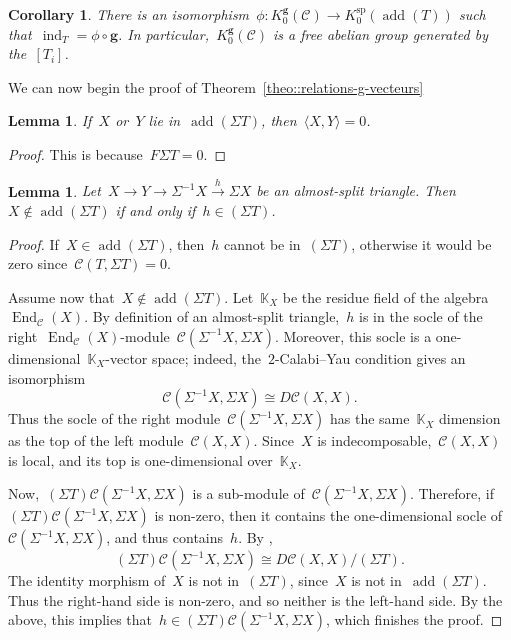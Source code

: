\documentclass{amsart}
\newtheorem{corollary}[theorem]{Corollary}
\newtheorem{lemma}[theorem]{Lemma}
\theoremstyle{definition}
\renewcommand{\b}[1]{{\boldsymbol{#1}}} %
\newcommand{\field}{\mathbb{K}}
\newcommand{\cat}{\mathcal{C}}
\newcommand{\susp}{\Sigma}
\newcommand{\add}{\operatorname{add}}
\newcommand{\End}[1]{\operatorname{End}_{#1}}
\newcommand{\spl}{\operatorname{sp}}
\newcommand{\Ksp}{K_0^{\spl}}
\newcommand{\Kg}{K_0^{\b{g}}}
\newcommand{\ind}{\operatorname{ind}}
\begin{document}
\begin{corollary}\label{coro::grothendieck-g-vectors}
 There is an isomorphism~$\phi:\Kg(\cat) \to \Ksp(\add(T))$ such that~$\ind_T = \phi\circ \b g$.  In particular,~$\Kg(\cat)$ is a free abelian group generated by the~$[T_i]$.
\end{corollary}

We can now begin the proof of Theorem~\ref{theo::relations-g-vecteurs}

\begin{lemma}\label{lemm::bilinear-form-suspention-T}
 If~$X$ or~$Y$ lie in~$\add(\susp T)$, then~$\langle X, Y \rangle = 0$.
\end{lemma}
\begin{proof}
 This is because~$F\susp T = 0$.
\end{proof}

\begin{lemma}\label{lemm::almost-split}
 Let~$X\xrightarrow{} Y \xrightarrow{} \susp^{-1} X \xrightarrow{h} \susp X$ be an almost-split triangle.  Then~$X\notin \add(\susp T)$ if and only if~$h\in (\susp T)$.
\end{lemma}
\begin{proof}
 If~$X\in \add(\susp T)$, then~$h$ cannot be in~$(\susp T)$, otherwise it would be zero since~$\cat(T, \susp T) =0$.  
 
 Assume now that~$X\notin \add(\susp T)$.  Let~$\field_X$ be the residue field of the algebra~$\End{\cat}(X)$. 
 By definition of an almost-split triangle,~$h$ is in the socle of the right~$\End{\cat}(X)$-module~$\cat(\susp^{-1} X, \susp X)$.  Moreover, this socle is a one-dimensional~$\field_X$-vector space; indeed, the~$2$-Calabi--Yau condition gives an isomorphism
 \[
  \cat(\susp^{-1} X, \susp X) \cong D\cat(X, X).
 \]
 Thus the socle of the right module~$\cat(\susp^{-1} X, \susp X)$ has the same~$\field_X$ dimension as the top of the left module~$\cat(X,X)$.  Since~$X$ is indecomposable,~$\cat(X,X)$ is local, and its top is one-dimensional over~$\field_X$.
 
 Now,~$(\susp T)\cat(\susp^{-1} X, \susp X)$ is a sub-module of~$\cat(\susp^{-1} X, \susp X)$.  Therefore, if~$(\susp T)\cat(\susp^{-1} X, \susp X)$ is non-zero, then it contains the one-dimensional socle of~$\cat(\susp^{-1} X, \susp X)$, and thus contains~$h$.   
 By \cite{Palu},
 \[
  (\susp T)\cat(\susp^{-1} X, \susp X) \cong D\cat(X, X)/(\susp T). 
 \]
The identity morphism of~$X$ is not in~$(\susp T)$, since~$X$ is not in~$\add(\susp T)$.  Thus the right-hand side is non-zero, and so neither is the left-hand side.  By the above, this implies that~$h\in (\susp T)\cat(\susp^{-1} X, \susp X)$, which finishes the proof.
\end{proof}
\end{document}
